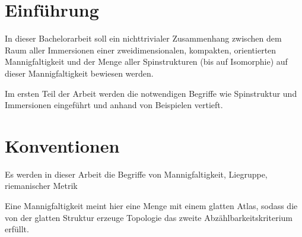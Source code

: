 
\section*{Einführung}

In dieser Bachelorarbeit soll ein nichttrivialer Zusammenhang zwischen
dem Raum aller Immersionen einer zweidimensionalen, kompakten, orientierten Mannigfaltigkeit und der Menge aller Spinstrukturen (bis auf Isomorphie) auf dieser Mannigfaltigkeit
bewiesen werden.

Im ersten Teil der Arbeit werden die notwendigen Begriffe wie Spinstruktur
und Immersionen eingeführt und anhand von Beispielen vertieft.

\section{Konventionen}
Es werden in dieser Arbeit die Begriffe von Mannigfaltigkeit, Liegruppe,
riemanischer Metrik 

Eine Mannigfaltigkeit meint hier eine Menge mit einem glatten Atlas, sodass die von der glatten Struktur erzeuge Topologie das zweite Abzählbarkeitskriterium erfüllt.

%
%
%
%
%
%
%


